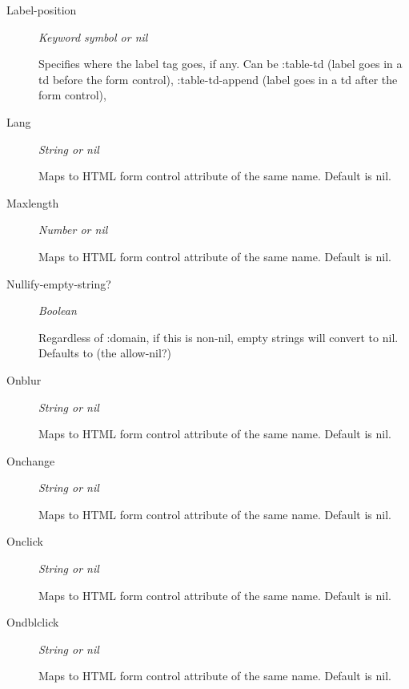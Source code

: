 \documentclass [11pt]{book}
\begin{document}
\begin{itemize}
\begin{description}
\item [Label-position]
\emph{Keyword symbol or nil}

 Specifies where the label tag goes, if any.
Can be :table-td (label goes in a td before the form control), :table-td-append (label goes in a td after the form control),




\item [Lang]
\emph{String or nil}

 Maps to HTML form control attribute of the same name. Default is nil.




\item [Maxlength]
\emph{Number or nil}

 Maps to HTML form control attribute of the same name. Default is nil.




\item [Nullify-empty-string?]
\emph{Boolean}

 Regardless of :domain, if this is non-nil, empty strings will convert to nil. Defaults to (the allow-nil?)




\item [Onblur]
\emph{String or nil}

 Maps to HTML form control attribute of the same name. Default is nil.




\item [Onchange]
\emph{String or nil}

 Maps to HTML form control attribute of the same name. Default is nil.




\item [Onclick]
\emph{String or nil}

 Maps to HTML form control attribute of the same name. Default is nil.




\item [Ondblclick]
\emph{String or nil}

 Maps to HTML form control attribute of the same name. Default is nil.





\end{description}
\end{itemize}
\end{document}
